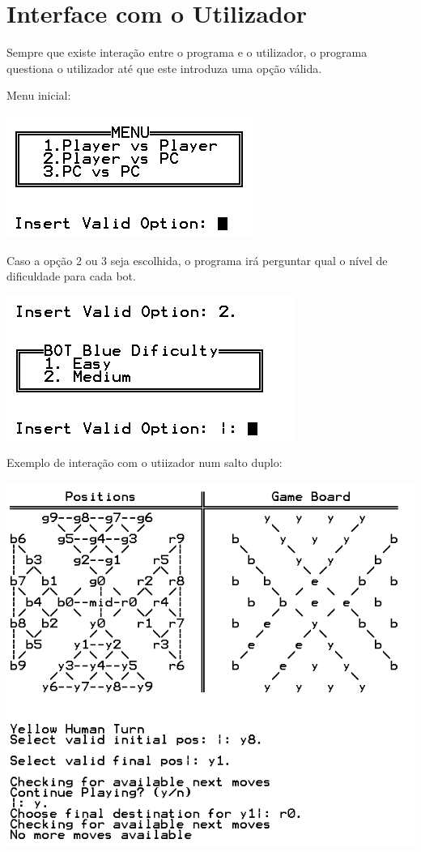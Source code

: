 \documentclass[a4paper]{article}
\begin{document}
\section{Interface com o Utilizador}
Sempre que existe interação entre o programa e o utilizador, o programa questiona o utilizador até que este introduza uma opção válida.
\begin{flushleft} 
Menu inicial: 
\end{flushleft} 
\includegraphics[scale=0.8]{initialMenu.png}\linebreak
\begin{flushleft} 
Caso a opção 2 ou 3 seja escolhida, o programa irá perguntar qual o nível de dificuldade para cada bot.\linebreak
\end{flushleft} 
\includegraphics[scale=0.8]{chooseBotDifficulty.png}\linebreak\linebreak
\begin{flushleft} 
Exemplo de interação com o utiizador num salto duplo:\linebreak
\end{flushleft} 
\includegraphics[scale=0.8]{doubleJump.png}\linebreak\linebreak
\end{document}

